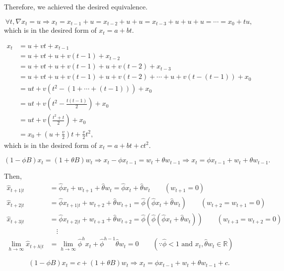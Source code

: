 \documentclass{article}
\renewcommand*{\implies}{\ensuremath{\Longrightarrow}}
\begin{document}
Therefore, we achieved the desired equivalence.


$$\forall t, \nabla x_t = u \implies x_t = x_{t-1} + u = x_{t-2} + u + u = x_{t-3} + u + u + u = \cdots = x_0 + tu,$$
which is in the desired form of $x_t = a+bt$.

\begin{align*}
    x_t & = u + vt + x_{t-1} \\
    & = u + vt + u + v(t-1) + x_{t-2} \\
    & = u + vt + u + v(t-1) + u + v(t-2) + x_{t-3} \\
    & = u + vt + u + v(t-1) + u + v(t-2) + \cdots + u + v(t-(t-1)) + x_0 \\
    & = ut + v\left(t^2 - (1 + \cdots + (t-1))\right) + x_0 \\
    & = ut + v\left(t^2 - \frac{t(t-1)}{2}\right) + x_0 \\
    & = ut + v\left(\frac{t^2 + t}{2}\right) + x_0 \\
    & = x_0 + \left(u + \frac{v}{2}\right)t + \frac{v}{2}t^2,
\end{align*}
which is in the desired form of $x_t = a + bt + ct^2$.

$$(1-\phi B)x_t = (1 + \theta B)w_t \implies 
x_t - \phi x_{t-1} = w_t + \theta w_{t-1} \implies
x_t = \phi x_{t-1} + w_t + \theta w_{t-1}.$$

Then, 
\begin{align*}
    \hat{x}_{t+1|t} & = \hat{\phi}x_t + w_{t+1} + \hat{\theta}w_t = 
    \hat{\phi}x_t + \hat{\theta}w_t \qquad (w_{t+1} = 0) \\
    \hat{x}_{t+2|t} & = \hat{\phi}x_{t+1|t} + w_{t+2} + \hat{\theta}w_{t+1} =
    \hat{\phi}\left(\hat{\phi}x_t + \hat{\theta}w_t\right) \qquad (w_{t+2} =w_{t+1} = 0) \\
    \hat{x}_{t+3|t} & = \hat{\phi}x_{t+2|t} + w_{t+3} + \hat{\theta}w_{t+2} =
    \hat{\phi}\left(\hat{\phi}\left(\hat{\phi}x_t + \hat{\theta}w_t\right)\right) \qquad (w_{t+3} =w_{t+2} = 0) \\
    &\quad \vdots \\
    \lim_{h\to\infty}\hat{x}_{t+h|t} & = \lim_{h\to\infty}\hat{\phi}^{h}x_t +
    \hat{\phi}^{h-1}\hat{\theta}w_t = 0 \qquad (\because \hat{\phi} < 1 \text{ and } x_t, \hat{\theta}w_t\in\mathbb{R})
\end{align*}

$$(1-\phi B)x_t=c+(1+\theta B)w_t \implies x_t = \phi x_{t-1} + w_t + \theta w_{t-1} + c.$$
\end{document}
